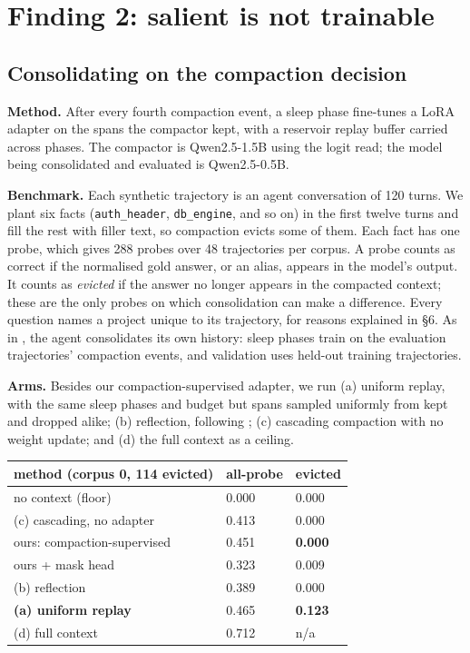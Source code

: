 \documentclass[10pt]{article}
\begin{document}
\section{Finding 2: salient is not trainable}

\subsection{Consolidating on the compaction decision}

\textbf{Method.} After every fourth compaction event, a sleep phase fine-tunes a LoRA adapter on
the spans the compactor kept, with a reservoir replay buffer carried across phases. The
compactor is Qwen2.5-1.5B using the logit read; the model being consolidated and evaluated is
Qwen2.5-0.5B.

\textbf{Benchmark.} Each synthetic trajectory is an agent conversation of 120 turns. We plant six facts
(\texttt{auth\_header}, \texttt{db\_engine}, and so on) in the first twelve turns and fill the rest with
filler text, so compaction evicts some of them. Each fact has one probe, which gives 288 probes
over 48 trajectories per corpus. A probe counts as correct if the normalised gold answer, or
an alias, appears in the model's output. It counts as \emph{evicted} if the answer no longer
appears in the compacted context; these are the only probes on which consolidation can make
a difference. Every question names a project unique to its trajectory, for reasons explained
in §6. As in \citet{dennis2026beyond}, the agent consolidates its own history: sleep phases train on the
evaluation trajectories' compaction events, and validation uses held-out training
trajectories.

\textbf{Arms.} Besides our compaction-supervised adapter, we run (a) uniform replay, with the same
sleep phases and budget but spans sampled uniformly from kept and dropped alike; (b)
reflection, following \citet{dennis2026beyond}; (c) cascading compaction with no weight update; and (d) the full
context as a ceiling.

\begin{longtable}[]{@{}lll@{}}
\toprule\noalign{}
method (corpus 0, 114 evicted) & all-probe & evicted \\
\midrule\noalign{}
\endhead
\bottomrule\noalign{}
\endlastfoot
no context (floor) & 0.000 & 0.000 \\
(c) cascading, no adapter & 0.413 & 0.000 \\
ours: compaction-supervised & 0.451 & \textbf{0.000} \\
ours + mask head & 0.323 & 0.009 \\
(b) reflection & 0.389 & 0.000 \\
\textbf{(a) uniform replay} & 0.465 & \textbf{0.123} \\
(d) full context & 0.712 & n/a \\
\end{longtable}
\end{document}
